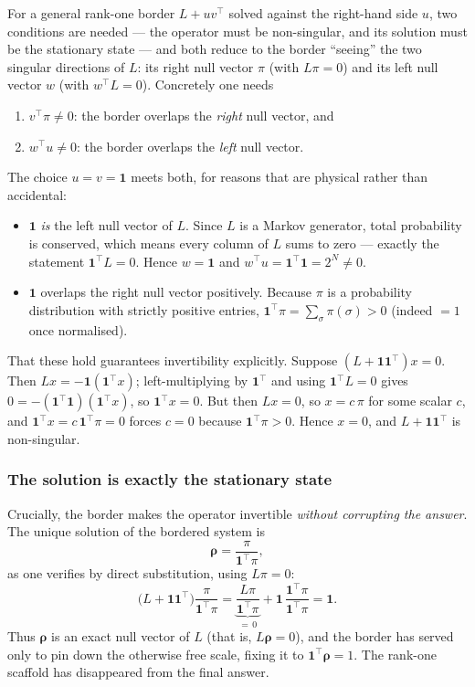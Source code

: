 \documentclass[12pt]{article}
\newcommand{\brho}{\boldsymbol{\rho}}
\theoremstyle{definition}
\theoremstyle{remark}
\begin{document}
For a general rank-one border $L + u v^\top$ solved against the right-hand side $u$, two conditions are needed --- the operator must be non-singular, and its solution must be the stationary state --- and both reduce to the border ``seeing'' the two singular directions of $L$: its right null vector $\pi$ (with $L\pi = 0$) and its left null vector $w$ (with $w^\top L = 0$). Concretely one needs
\begin{enumerate}
    \item $v^\top \pi \neq 0$: the border overlaps the \emph{right} null vector, and
    \item $w^\top u \neq 0$: the border overlaps the \emph{left} null vector.
\end{enumerate}
The choice $u = v = \mathbf{1}$ meets both, for reasons that are physical rather than accidental:
\begin{itemize}
    \item $\mathbf{1}$ \emph{is} the left null vector of $L$. Since $L$ is a Markov generator, total probability is conserved, which means every column of $L$ sums to zero --- exactly the statement $\mathbf{1}^\top L = 0$. Hence $w = \mathbf{1}$ and $w^\top u = \mathbf{1}^\top \mathbf{1} = 2^N \neq 0$.
    \item $\mathbf{1}$ overlaps the right null vector positively. Because $\pi$ is a probability distribution with strictly positive entries, $\mathbf{1}^\top \pi = \sum_\sigma \pi(\sigma) > 0$ (indeed $= 1$ once normalised).
\end{itemize}
That these hold guarantees invertibility explicitly. Suppose $(L + \mathbf{1}\mathbf{1}^\top)x = 0$. Then $Lx = -\mathbf{1}(\mathbf{1}^\top x)$; left-multiplying by $\mathbf{1}^\top$ and using $\mathbf{1}^\top L = 0$ gives $0 = -(\mathbf{1}^\top \mathbf{1})(\mathbf{1}^\top x)$, so $\mathbf{1}^\top x = 0$. But then $Lx = 0$, so $x = c\,\pi$ for some scalar $c$, and $\mathbf{1}^\top x = c\,\mathbf{1}^\top \pi = 0$ forces $c = 0$ because $\mathbf{1}^\top \pi > 0$. Hence $x = 0$, and $L + \mathbf{1}\mathbf{1}^\top$ is non-singular.

\subsubsection*{The solution is exactly the stationary state}

Crucially, the border makes the operator invertible \emph{without corrupting the answer}. The unique solution of the bordered system is
\[
\brho = \frac{\pi}{\mathbf{1}^\top \pi},
\]
as one verifies by direct substitution, using $L\pi = 0$:
\[
\big(L + \mathbf{1}\mathbf{1}^\top\big)\frac{\pi}{\mathbf{1}^\top \pi}
= \underbrace{\frac{L\pi}{\mathbf{1}^\top \pi}}_{=\,0}
+ \mathbf{1}\,\frac{\mathbf{1}^\top \pi}{\mathbf{1}^\top \pi}
= \mathbf{1}.
\]
Thus $\brho$ is an exact null vector of $L$ (that is, $L\brho = 0$), and the border has served only to pin down the otherwise free scale, fixing it to $\mathbf{1}^\top \brho = 1$. The rank-one scaffold has disappeared from the final answer.
\end{document}
